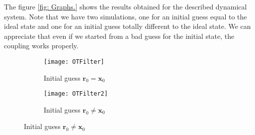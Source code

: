 The figure \ref{fig: Graphs.} shows the results obtained for the described dynamical system. Note that we have two simulations, one for an initial guess equal to the ideal state and one for an initial guess totally different to the ideal state. We can appreciate that even if we started from a bad guess for the initial state, the coupling works properly.
\begin{figure}[H]
	\begin{center}
	\caption{Filter with Optimal Transport coupling. $\pmb{\Sigma}_z=0.2$, $\pmb{\Sigma}_x=0.01$.}		
	\label{fig: Graphs.}
	\begin{subfigure}{0.48 \textwidth}
	\caption{Initial guess $\mathbf{r}_0=\mathbf{x}_0$}
	\texttt{[image: OTFilter]}
	\end{subfigure}
	\begin{subfigure}{0.48\textwidth}
	\caption{Initial guess $\mathbf{r}_0\neq\mathbf{x}_0$}
	\texttt{[image: OTFilter2]}
	\end{subfigure}
	\end{center}

\end{figure}
